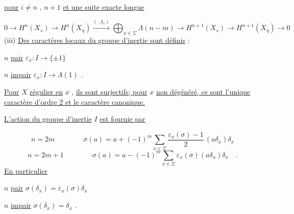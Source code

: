 \underline{pour} $i \neq n$ , $n+1$ \underline{et une suite exacte longue} 



\begin{equation*}
 0 \longrightarrow H^n(X_s) \longrightarrow H^n(X_{\overline{\eta}}) \overset{(\ , \delta_x)}{\longrightarrow} \bigoplus_{x \in \Sigma} \Lambda(n-m) \longrightarrow H^{n+1}(X_s) \longrightarrow H^{n+1}(X_{\eta}) \longrightarrow 0
\end{equation*}
(iii) \underline{Des caractères locaux du groupe d'inertie sont définis} :

$n$ \quad \underline{pair} \qquad $\varepsilon_x : I \longrightarrow \{\pm 1\}$

$n$ \quad \underline{impair} \qquad $\varepsilon_x : I \longrightarrow \Lambda(1)$ .

\underline{Pour} $X$ \underline{régulier en} $x$ , \underline{ils sont surjectifs; pour} $x$ \underline{non dégénéré, ce sont l'unique caractère d'ordre 2 et le caractère canonique.}

\underline{L'action du groupe d'inertie} $I$ \underline{est fournie par}

\begin{equation*}
n = 2m \qquad\qquad \sigma(a) = a + (-1)^m \sum_{x \in \Sigma} \frac{\varepsilon_x(\sigma)-1}{2}\, (a\delta_x)\delta_x
\end{equation*}
\begin{equation*}
n = 2m + 1 \qquad\qquad \sigma(a) = a - (-1)^m \sum_{x \in \Sigma} \varepsilon_x(\sigma)(a\delta_x)\delta_x \quad .
\end{equation*}
\underline{En particulier}

$n$ \quad \underline{pair} \qquad $\sigma(\delta_x) = \varepsilon_x(\sigma)\delta_x$

$n$ \quad \underline{impair} \qquad $\sigma(\delta_x) = \delta_x$ .

